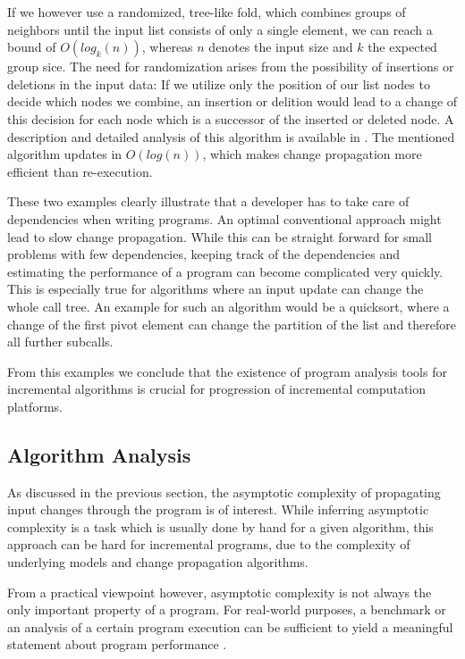If we however use a randomized, tree-like fold, which combines groups of neighbors until the input list consists of only a single element, we can reach a bound of $O(log_k(n))$, whereas $n$ denotes the input size and $k$ the expected group sice. 
The need for randomization arises from the possibility of insertions or deletions in the input data: If we utilize only the position of our list nodes to decide which nodes we combine, an insertion or delition would lead to a change of this decision for each node which is a successor of the inserted or deleted node. A description and detailed analysis of this algorithm is available in \cite{Acar2005thesis}. The mentioned algorithm updates in $O(log(n))$, which makes change propagation more efficient than re-execution. 

These two examples clearly illustrate that a developer has to take care of dependencies when writing programs. An optimal conventional approach might lead to slow change propagation. While this can be straight forward for small problems with few dependencies, keeping track of the dependencies and estimating the performance of a program can become complicated very quickly. This is especially true for algorithms where an input update can change the whole call tree. An example for such an algorithm would be a quicksort\cite{hoare1962quicksort}, where a change of the first pivot element can change the partition of the list and therefore all further subcalls. 

From this examples we conclude that the existence of program analysis tools for incremental algorithms is crucial for progression of incremental computation platforms. 

\subsection{Algorithm Analysis}

As discussed in the previous section, the asymptotic complexity of propagating input changes through the program is of interest. While inferring asymptotic complexity is a task which is usually done by hand for a given algorithm, this approach can be hard for incremental programs, due to the complexity of underlying models and change propagation algorithms. 

From a practical viewpoint however, asymptotic complexity is not always the only important property of a program. For real-world purposes, a benchmark or an analysis of a certain program execution can be sufficient to yield a meaningful statement about program performance \cite{vokolos1998performance}.

